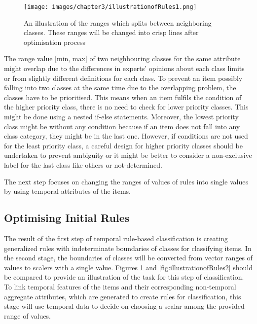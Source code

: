 \begin{figure}[!h]
	\centering
	\texttt{[image: images/chapter3/illustrationofRules1.png]}
	\caption{An illustration of the ranges which splits between neighboring classes. These ranges will be changed into crisp lines after optimisation process}
	\label{fig:illustrationofRules1}
\end{figure}

The range value [min, max] of two neighbouring classes for the same attribute might overlap due to the differences in experts' opinions about each class limits or from slightly different definitions for each class. To prevent an item possibly falling into two classes at the same time due to the overlapping problem, the classes have to be prioritised. This means when an item fulfils the condition of the higher priority class, there is no need to check for lower priority classes. This might be done using a nested if-else statements. Moreover, the lowest priority class might be without any condition because if an item does not fall into any class category, they might be in the last one. However, if conditions are not used for the least priority class, a careful design for higher priority classes should be undertaken to prevent ambiguity or it might be better to consider a non-exclusive label for the last class like others or not-determined.


The next step focuses on changing the ranges of values of rules into single values by using temporal attributes of the items.



\subsection{Optimising Initial Rules}
\label{sec:Optimising-Initial-Rules}

The result of the first step of temporal rule-based classification is creating generalized rules with indeterminate boundaries of classes for classifying items. In the second stage, the boundaries of classes will be converted from vector ranges of values to scalers with a single value. Figures \ref{fig:illustrationofRules1} and \ref{fig:illustrationofRules2} should be compared to provide an illustration of the task for this step of classification. To link temporal features of the items and their corresponding non-temporal aggregate attributes, which are generated to create rules for classification, this stage will use temporal data to decide on choosing a scalar among the provided range of values. 


